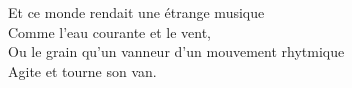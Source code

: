 Et ce monde rendait une \'{e}trange musique\\
Comme l'eau courante et le vent,\\
Ou le grain qu'un vanneur d'un mouvement rhytmique\\
Agite et tourne son van.
